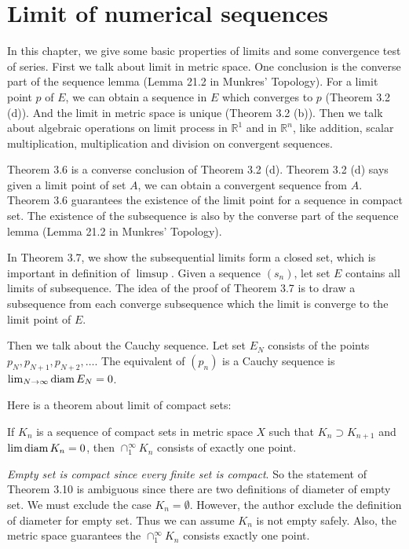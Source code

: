 \section{Limit of numerical sequences}
In this chapter, we give some basic properties of limits and some convergence test of series. First we talk about limit in metric space. One conclusion is the converse part of the sequence lemma (Lemma 21.2 in Munkres' Topology). For a limit point $p$ of $E$, we can obtain a sequence in $E$ which converges to $p$ (Theorem 3.2 (d)). And the limit in metric space is unique (Theorem 3.2 (b)). Then we talk about algebraic operations on limit process in $\mathbb{R}^1$ and in $\mathbb{R}^n$, like addition, scalar multiplication, multiplication and division on convergent sequences.\par
Theorem 3.6 is a converse conclusion of Theorem 3.2 (d). Theorem 3.2 (d) says given a limit point of set $A$, we can obtain a convergent sequence from $A$. Theorem 3.6 guarantees the existence of the limit point for a sequence in compact set. The existence of the subsequence is also by the converse part of the sequence lemma (Lemma 21.2 in Munkres' Topology). \par
In Theorem 3.7, we show the subsequential limits form a closed set, which is important in definition of $\limsup$. Given a sequence $(s_n)$, let set $E$ contains all limits of subsequence. The idea of the proof of Theorem 3.7 is to draw a subsequence from each converge subsequence which the limit is converge to the limit point of $E$.\par
Then we talk about the Cauchy sequence. Let set $E_N$ consists of the points $p_N, p_{N+1}, p_{N+2},\dots$. The equivalent of $(p_n)$ is a Cauchy sequence is $\lim_{N\to \infty}\operatorname{diam} E_N=0$.\par
Here is a theorem about limit of compact sets:
\begin{theorem}[Theorem 3.10]
    If $K_n$ is a sequence of compact sets in metric space $X$ such that $K_n\supset K_{n+1}$ and $\lim\operatorname{diam} K_n=0$, then $\cap_1^{\infty}K_n$ consists of exactly one point.
\end{theorem}
\emph{Empty set is compact since every finite set is compact}. So the statement of Theorem 3.10 is ambiguous since there are two definitions of diameter of empty set. We must exclude the case $K_n=\emptyset$. However, the author exclude the definition of diameter for empty set. Thus we can assume $K_n$ is not empty safely. Also, the metric space guarantees the $\cap_1^\infty K_n$ consists exactly one point.
